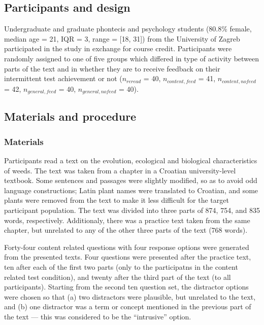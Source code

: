 \documentclass[11pt,]{article}
\title{}
\author{}
\date{}
\begin{document}
\twocolumn

\hypertarget{participants-and-design}{%
\subsection{Participants and design}\label{participants-and-design}}

Undergraduate and graduate phontecis and psychology students (80.8\%
female, median age = 21, IQR = 3, range = {[}18, 31{]}) from the
University of Zagreb participated in the study in exchange for course
credit. Participants were randomly assigned to one of five groups which
differed in type of activity between parts of the text and in whether
they are to receive feedback on their intermittent test achievement or
not (\(n_{reread}\) = 40, \(n_{content, feed}\) = 41,
\(n_{content, nofeed}\) = 42, \(n_{general, feed}\) = 40,
\(n_{general, nofeed}\) = 40).

\hypertarget{materials-and-procedure}{%
\subsection{Materials and procedure}\label{materials-and-procedure}}

\hypertarget{materials}{%
\subsubsection{Materials}\label{materials}}

Participants read a text on the evolution, ecological and biological
characteristics of weeds. The text was taken from a chapter in a
Croatian university-level textbook. Some sentences and passages were
slightly modified, so as to avoid odd language constructions; Latin
plant names were translated to Croatian, and some plants were removed
from the text to make it less difficult for the target participant
population. The text was divided into three parts of 874, 754, and 835
words, respectively. Additionaly, there was a practice text taken from
the same chapter, but unrelated to any of the other three parts of the
text (768 words).

Forty-four content related questions with four response options were
generated from the presented texts. Four questions were presented after
the practice text, ten after each of the first two parts (only to the
participatns in the content related test condition), and twenty after
the third part of the text (to all participants). Starting from the
second ten question set, the distractor options were chosen so that (a)
two distractors were plausible, but unrelated to the text, and (b) one
distractor was a term or concept mentioned in the previous part of the
text --- this was considered to be the ``intrusive'' option.
\end{document}
